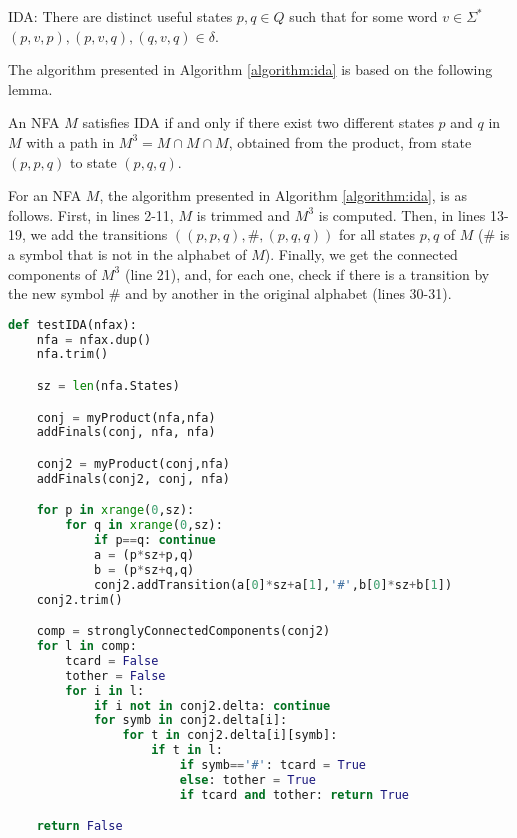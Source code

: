 IDA: There are distinct useful states $p,q \in Q$ such that for some word $v \in \Sigma^*$ $(p,v,p),(p,v,q),(q,v,q) \in \delta$.

The algorithm presented in Algorithm \ref{algorithm:ida} is based on the following lemma.

\begin{lemma} \textbf{\cite{AllauzenMR11}}
An NFA $M$ satisfies IDA if and only if there exist two different states $p$ and $q$ in $M$ with a path in $M^3=M \cap M \cap M$, obtained from the product, from state $(p,p,q)$ to state $(p,q,q)$.
\end{lemma}

For an NFA $M$, the algorithm presented in Algorithm \ref{algorithm:ida}, is as follows. First, in lines 2-11, $M$ is trimmed and $M^3$ is computed. Then, in lines 13-19, we add the transitions $((p,p,q),\#,(p,q,q))$ for all states $p,q$ of $M$ ($\#$ is a symbol that is not in the alphabet of $M$). %
Finally, we get the connected components of $M^3$ (line 21), and, for each one, check if there is a transition by the new symbol $\#$ and by another in the original alphabet (lines 30-31).

\begin{lstlisting}[language=Python, caption = Algorithm to test IDA criterion, label={algorithm:ida}]
def testIDA(nfax):
    nfa = nfax.dup()
    nfa.trim()

    sz = len(nfa.States)

    conj = myProduct(nfa,nfa)
    addFinals(conj, nfa, nfa)

    conj2 = myProduct(conj,nfa)
    addFinals(conj2, conj, nfa)

    for p in xrange(0,sz):
        for q in xrange(0,sz):
            if p==q: continue
            a = (p*sz+p,q)
            b = (p*sz+q,q)
            conj2.addTransition(a[0]*sz+a[1],'#',b[0]*sz+b[1])
    conj2.trim()

    comp = stronglyConnectedComponents(conj2)
    for l in comp:
        tcard = False
        tother = False
        for i in l:
            if i not in conj2.delta: continue
            for symb in conj2.delta[i]:
                for t in conj2.delta[i][symb]:
                    if t in l:
                        if symb=='#': tcard = True
                        else: tother = True
                        if tcard and tother: return True

    return False
\end{lstlisting}


